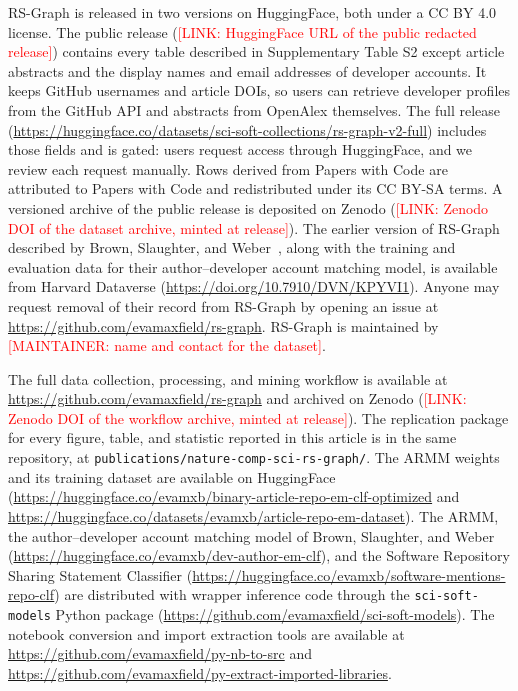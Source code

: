 \documentclass[pdflatex,sn-nature]{sn-jnl}%
\begin{document}
\backmatter


RS-Graph is released in two versions on HuggingFace, both under a CC BY 4.0 license. The public release (\textcolor{red}{[LINK: HuggingFace URL of the public redacted release]}) contains every table described in Supplementary Table S2 except article abstracts and the display names and email addresses of developer accounts. It keeps GitHub usernames and article DOIs, so users can retrieve developer profiles from the GitHub API and abstracts from OpenAlex themselves. The full release (\url{https://huggingface.co/datasets/sci-soft-collections/rs-graph-v2-full}) includes those fields and is gated: users request access through HuggingFace, and we review each request manually. Rows derived from Papers with Code are attributed to Papers with Code and redistributed under its CC BY-SA terms. A versioned archive of the public release is deposited on Zenodo (\textcolor{red}{[LINK: Zenodo DOI of the dataset archive, minted at release]}). The earlier version of RS-Graph described by Brown, Slaughter, and Weber~\cite{brown2026code}, along with the training and evaluation data for their author--developer account matching model, is available from Harvard Dataverse (\url{https://doi.org/10.7910/DVN/KPYVI1}). Anyone may request removal of their record from RS-Graph by opening an issue at \url{https://github.com/evamaxfield/rs-graph}. RS-Graph is maintained by \textcolor{red}{[MAINTAINER: name and contact for the dataset]}.


The full data collection, processing, and mining workflow is available at \url{https://github.com/evamaxfield/rs-graph} and archived on Zenodo (\textcolor{red}{[LINK: Zenodo DOI of the workflow archive, minted at release]}). The replication package for every figure, table, and statistic reported in this article is in the same repository, at \texttt{publications/nature-comp-sci-rs-graph/}. The ARMM weights and its training dataset are available on HuggingFace (\url{https://huggingface.co/evamxb/binary-article-repo-em-clf-optimized} and \url{https://huggingface.co/datasets/evamxb/article-repo-em-dataset}). The ARMM, the author--developer account matching model of Brown, Slaughter, and Weber~\cite{brown2026code} (\url{https://huggingface.co/evamxb/dev-author-em-clf}), and the Software Repository Sharing Statement Classifier (\url{https://huggingface.co/evamxb/software-mentions-repo-clf}) are distributed with wrapper inference code through the \texttt{sci-soft-models} Python package (\url{https://github.com/evamaxfield/sci-soft-models}). The notebook conversion and import extraction tools are available at \url{https://github.com/evamaxfield/py-nb-to-src} and \url{https://github.com/evamaxfield/py-extract-imported-libraries}.
\end{document}
